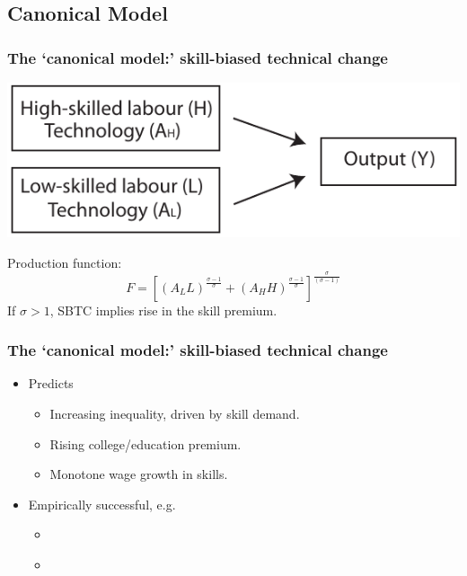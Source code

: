 \documentclass[red]{beamer}
\begin{document}
\subsection{Canonical Model}
\begin{frame}[c]
\frametitle{The `canonical model:' skill-biased technical change}
\begin{center}
  \includegraphics[width=\textwidth]{slides_fig/CES.pdf}
\end{center}
Production function:
\begin{equation*}
  \label{eq:cobbdoug}
  F = \left[\left(A_LL\right)^{\frac{\sigma - 1}{\sigma}}
            + \left(A_HH\right)^{\frac{\sigma - 1}{\sigma}}
          \right]^\frac{\sigma}{(\sigma-1)}
\end{equation*}
If $\sigma>1$, SBTC implies rise in the skill premium.
\end{frame}

\begin{frame}
\frametitle{The `canonical model:' skill-biased technical change}
\begin{itemize}
\item Predicts
  \begin{itemize}
  \item Increasing inequality, driven by skill demand.
  \item Rising college/education premium.
  \item Monotone wage growth in skills.
  \end{itemize}
\vspace{1cm}
\item Empirically successful, e.g.
  \begin{itemize}
  \item \citet{Katz1992}
  \item \citet{Card2001}
  \end{itemize}
\end{itemize}
\end{frame}
\end{document}
